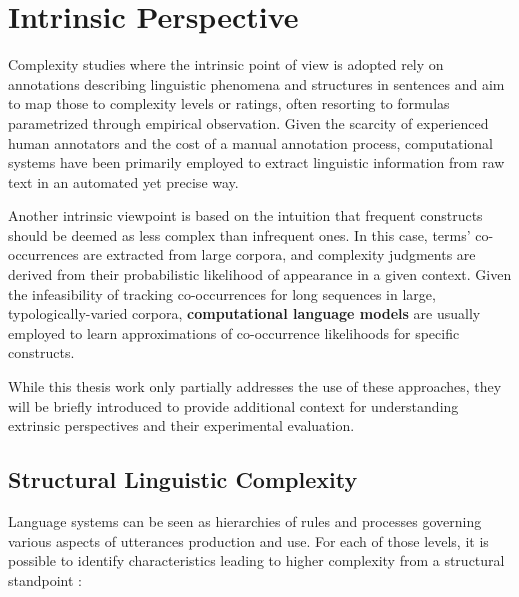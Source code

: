 \documentclass[a4paper, nobind]{templates/ociamthesis}
\begin{document}
\hypertarget{subchap:intrinsic}{%
\section{Intrinsic Perspective}\label{subchap:intrinsic}}

Complexity studies where the intrinsic point of view is adopted rely on annotations describing linguistic phenomena and structures in sentences and aim to map those to complexity levels or ratings, often resorting to formulas parametrized through empirical observation. Given the scarcity of experienced human annotators and the cost of a manual annotation process, computational systems have been primarily employed to extract linguistic information from raw text in an automated yet precise way.

Another intrinsic viewpoint is based on the intuition that frequent constructs should be deemed as less complex than infrequent ones. In this case, terms' co-occurrences are extracted from large corpora, and complexity judgments are derived from their probabilistic likelihood of appearance in a given context. Given the infeasibility of tracking co-occurrences for long sequences in large, typologically-varied corpora, \textbf{computational language models} are usually employed to learn approximations of co-occurrence likelihoods for specific constructs.

While this thesis work only partially addresses the use of these approaches, they will be briefly introduced to provide additional context for understanding extrinsic perspectives and their experimental evaluation.

\hypertarget{subsubchap:structural}{%
\subsection{Structural Linguistic Complexity}\label{subsubchap:structural}}

Language systems can be seen as hierarchies of rules and processes governing various aspects of utterances production and use. For each of those levels, it is possible to identify characteristics leading to higher complexity from a structural standpoint \autocite{sinnemaki-2011-language}:
\end{document}
